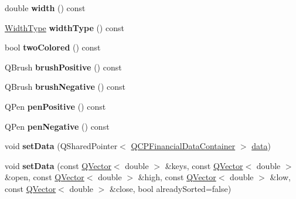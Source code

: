 \begin{DoxyCompactItemize}
\item 
\mbox{\label{class_q_c_p_financial_a12548f13658eda5833204ef60f524870}} 
double {\bfseries width} () const
\item 
\mbox{\label{class_q_c_p_financial_a7afa595e63800c072701e6e57d4ca9e2}} 
\hyperlink{class_q_c_p_financial_aef1761dda71a53dc5269685e9e492626}{Width\+Type} {\bfseries width\+Type} () const
\item 
\mbox{\label{class_q_c_p_financial_afd4b51de5be8e53776b649f9877a50e6}} 
bool {\bfseries two\+Colored} () const
\item 
\mbox{\label{class_q_c_p_financial_ae922e75f3d5b8854369ac0bf1ebfb053}} 
Q\+Brush {\bfseries brush\+Positive} () const
\item 
\mbox{\label{class_q_c_p_financial_ad4fdc5bc21f5eb17070e043bd4a35f53}} 
Q\+Brush {\bfseries brush\+Negative} () const
\item 
\mbox{\label{class_q_c_p_financial_ae803fe25fdd6f0acacde4539590795ed}} 
Q\+Pen {\bfseries pen\+Positive} () const
\item 
\mbox{\label{class_q_c_p_financial_a25d9a8f256e5ddcba56b6e2e7e968653}} 
Q\+Pen {\bfseries pen\+Negative} () const
\item 
\mbox{\label{class_q_c_p_financial_a72089e75b8a50d18097526c3c79fdb85}} 
void {\bfseries set\+Data} (Q\+Shared\+Pointer$<$ \hyperlink{class_q_c_p_data_container}{Q\+C\+P\+Financial\+Data\+Container} $>$ \hyperlink{class_q_c_p_financial_aec3f666271cf48bd7b87d84fe3f8c074}{data})
\item 
\mbox{\label{class_q_c_p_financial_a12992e669ed19d7bb48dbe601570cc05}} 
void {\bfseries set\+Data} (const \hyperlink{class_q_vector}{Q\+Vector}$<$ double $>$ \&keys, const \hyperlink{class_q_vector}{Q\+Vector}$<$ double $>$ \&open, const \hyperlink{class_q_vector}{Q\+Vector}$<$ double $>$ \&high, const \hyperlink{class_q_vector}{Q\+Vector}$<$ double $>$ \&low, const \hyperlink{class_q_vector}{Q\+Vector}$<$ double $>$ \&close, bool already\+Sorted=false)

\end{DoxyCompactItemize}
